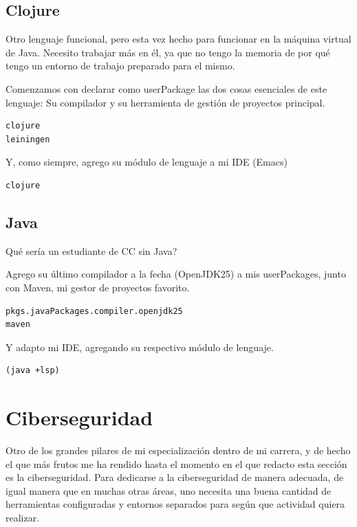 \documentclass[11pt]{article}
\begin{document}
\subsection{Clojure}
\label{sec:org41292cb}

Otro lenguaje funcional, pero esta vez hecho para funcionar en la máquina virtual de Java. Necesito trabajar más en él, ya que no tengo la memoria de por qué tengo un entorno de trabajo preparado para el mismo.

Comenzamos con declarar como userPackage las dos cosas esenciales de este lenguaje: Su compilador y su herramienta de gestión de proyectos principal.

\begin{verbatim}
clojure
leiningen
\end{verbatim}

Y, como siempre, agrego su módulo de lenguaje a mi IDE (Emacs)

\begin{verbatim}
clojure
\end{verbatim}
\subsection{Java}
\label{sec:orge4e9bb7}

Qué sería un estudiante de CC sin Java?

Agrego su último compilador a la fecha (OpenJDK25) a mis userPackages, junto con Maven, mi gestor de proyectos favorito.

\begin{verbatim}
pkgs.javaPackages.compiler.openjdk25
maven
\end{verbatim}

Y adapto mi IDE, agregando su respectivo módulo de lenguaje.

\begin{verbatim}
(java +lsp)
\end{verbatim}
\section{Ciberseguridad}
\label{sec:orgf93f630}

Otro de los grandes pilares de mi especialización dentro de mi carrera, y de hecho el que más frutos me ha rendido hasta el momento en el que redacto esta sección es la ciberseguridad. Para dedicarse a la ciberseguridad de manera adecuada, de igual manera que en muchas otras áreas, uno necesita una buena cantidad de herramientas configuradas y entornos separados para según que actividad quiera realizar.
\end{document}
